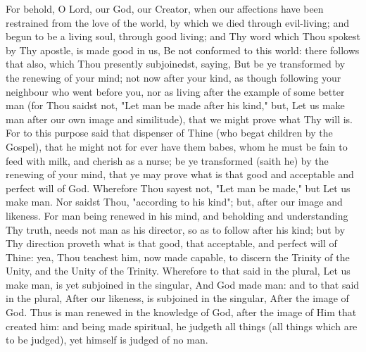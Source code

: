 \documentclass[b5paper,openright,12pt,twoside]{book}
\begin{document}
For behold, O Lord, our God, our Creator, when our affections have
been restrained from the love of the world, by which we died through
evil-living; and begun to be a living soul, through good living; and
Thy word which Thou spokest by Thy apostle, is made good in us, Be not
conformed to this world: there follows that also, which Thou presently
subjoinedst, saying, But be ye transformed by the renewing of your mind;
not now after your kind, as though following your neighbour who went
before you, nor as living after the example of some better man (for Thou
saidst not, "Let man be made after his kind," but, Let us make man after
our own image and similitude), that we might prove what Thy will is. For
to this purpose said that dispenser of Thine (who begat children by the
Gospel), that he might not for ever have them babes, whom he must be
fain to feed with milk, and cherish as a nurse; be ye transformed (saith
he) by the renewing of your mind, that ye may prove what is that good
and acceptable and perfect will of God. Wherefore Thou sayest not, "Let
man be made," but Let us make man. Nor saidst Thou, "according to his
kind"; but, after our image and likeness. For man being renewed in his
mind, and beholding and understanding Thy truth, needs not man as his
director, so as to follow after his kind; but by Thy direction proveth
what is that good, that acceptable, and perfect will of Thine: yea, Thou
teachest him, now made capable, to discern the Trinity of the Unity, and
the Unity of the Trinity. Wherefore to that said in the plural, Let us
make man, is yet subjoined in the singular, And God made man: and
to that said in the plural, After our likeness, is subjoined in the
singular, After the image of God. Thus is man renewed in the knowledge
of God, after the image of Him that created him: and being made
spiritual, he judgeth all things (all things which are to be judged),
yet himself is judged of no man.
\end{document}
